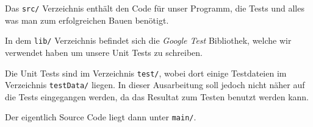 Das \texttt{src/} Verzeichnis enthält den Code für unser Programm, die Tests und alles was man zum erfolgreichen Bauen benötigt.

In dem \texttt{lib/} Verzeichnis befindet sich die \textit{Google Test} Bibliothek, welche wir verwendet haben um unsere Unit Tests zu schreiben.

Die Unit Tests sind im Verzeichnis \texttt{test/}, wobei dort einige Testdateien im Verzeichnis \texttt{testData/} liegen. In dieser Ausarbeitung soll jedoch nicht näher auf die Tests eingegangen werden, da das Resultat zum Testen benutzt werden kann.

Der eigentlich Source Code liegt dann unter \texttt{main/}.
